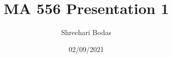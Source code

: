 \documentclass{beamer}
\title{MA 556 Presentation 1}
\author{Shreehari Bodas}
\institute{}
\date{02/09/2021}
\begin{document}
\frame{\titlepage}
\end{document}
